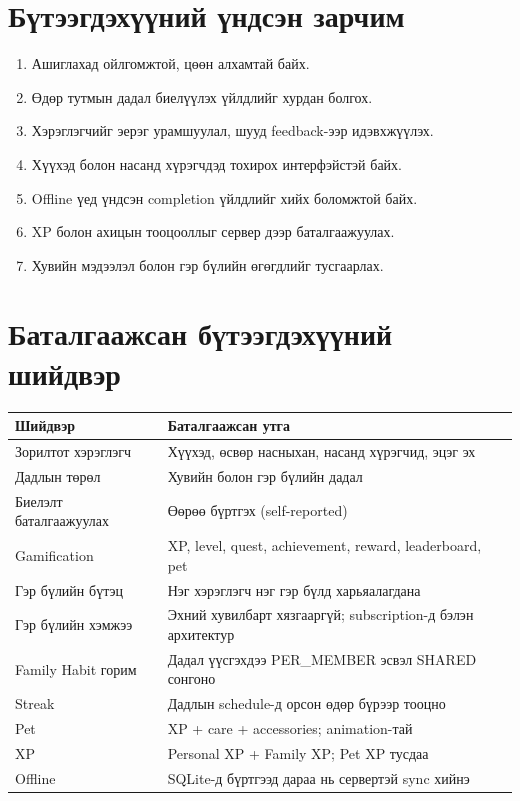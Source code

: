 \documentclass[12pt,a4paper,oneside]{report}
\begin{document}
\section{Бүтээгдэхүүний үндсэн зарчим}
\begin{enumerate}
  \item Ашиглахад ойлгомжтой, цөөн алхамтай байх.
  \item Өдөр тутмын дадал биелүүлэх үйлдлийг хурдан болгох.
  \item Хэрэглэгчийг эерэг урамшуулал, шууд feedback-ээр идэвхжүүлэх.
  \item Хүүхэд болон насанд хүрэгчдэд тохирох интерфэйстэй байх.
  \item Offline үед үндсэн completion үйлдлийг хийх боломжтой байх.
  \item XP болон ахицын тооцооллыг сервер дээр баталгаажуулах.
  \item Хувийн мэдээлэл болон гэр бүлийн өгөгдлийг тусгаарлах.
\end{enumerate}

\section{Баталгаажсан бүтээгдэхүүний шийдвэр}
\begin{longtable}{p{}p{}}
\toprule
\textbf{Шийдвэр} & \textbf{Баталгаажсан утга}\\
\midrule
Зорилтот хэрэглэгч & Хүүхэд, өсвөр насныхан, насанд хүрэгчид, эцэг эх\\
Дадлын төрөл & Хувийн болон гэр бүлийн дадал\\
Биелэлт баталгаажуулах & Өөрөө бүртгэх (self-reported)\\
Gamification & XP, level, quest, achievement, reward, leaderboard, pet\\
Гэр бүлийн бүтэц & Нэг хэрэглэгч нэг гэр бүлд харьяалагдана\\
Гэр бүлийн хэмжээ & Эхний хувилбарт хязгааргүй; subscription-д бэлэн архитектур\\
Family Habit горим & Дадал үүсгэхдээ PER\_MEMBER эсвэл SHARED сонгоно\\
Streak & Дадлын schedule-д орсон өдөр бүрээр тооцно\\
Pet & XP + care + accessories; animation-тай\\
XP & Personal XP + Family XP; Pet XP тусдаа\\
Offline & SQLite-д бүртгээд дараа нь сервертэй sync хийнэ\\
\bottomrule
\end{longtable}
\end{document}
